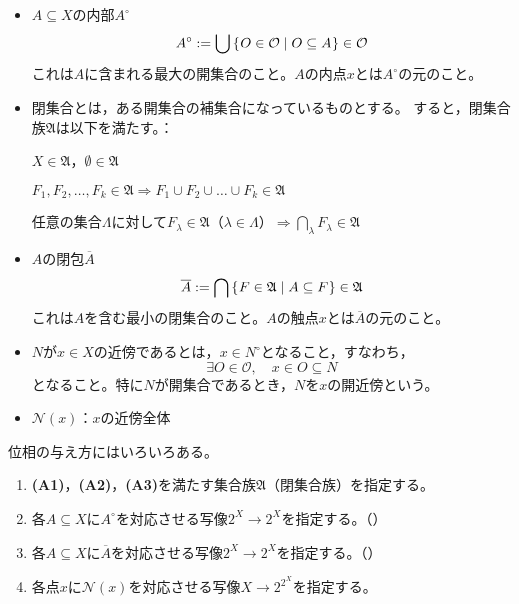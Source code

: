\documentclass[uplatex]{jsarticle}
\begin{document}
\begin{itemize}
  \vspace{-0.5\baselineskip}
  \item $A \subseteq X$の内部$A^{\circ}$
  \begin{equation}
    A^{\circ} := \bigcup \Set{\hspace{-1.8pt} O \in \mathcal{O} | O \subseteq A \hspace{-1.8pt}} \in \mathcal{O}
  \end{equation}
  これは$A$に含まれる最大の開集合のこと。$A$の内点$x$とは$A^{\circ}$の元のこと。
  \item 閉集合とは，ある開集合の補集合になっているものとする。
  すると，閉集合族$\mathfrak{A}$は以下を満たす。：

   $X \in \mathfrak{A}$，$\emptyset \in \mathfrak{A}$

   $F_{1}, F_{2}, \dots, F_{k} \in \mathfrak{A} \Longrightarrow F_{1} \cup F_{2} \cup \dots \cup F_{k} \in \mathfrak{A}$

   任意の集合$\Lambda$に対して$F_{\lambda} \in \mathfrak{A} $（$\lambda \in \Lambda$）$\Longrightarrow {\displaystyle \bigcap_{\lambda} F_{\lambda} \in \mathfrak{A}}$

  \item $A$の閉包$\overline{A}$
  \begin{equation}
    \overline{A} := \bigcap \Set{\hspace{-1.8pt} F \in \mathfrak{A} | A \subseteq F \hspace{-1.8pt}} \in \mathfrak{A}
  \end{equation}
  これは$A$を含む最小の閉集合のこと。$A$の触点$x$とは$\overline{A}$の元のこと。
  \item $N$が$x \in X$の近傍であるとは，$x \in N^{\circ}$となること，すなわち，
  \begin{equation}
    \exists O \in \mathcal{O}, \quad x \in O \subseteq N
  \end{equation}
  となること。特に$N$が開集合であるとき，$N$を$x$の開近傍という。
  \item $\mathcal{N}(x)$：$x$の近傍全体
\end{itemize}

位相の与え方にはいろいろある。
\begin{enumerate}
  \item {\bf (A1)}，{\bf (A2)}，{\bf (A3)}を満たす集合族$\mathfrak{A}$（閉集合族）を指定する。
  \item 各$A \subseteq X$に$A^{\circ}$を対応させる写像$2^{X} \longrightarrow 2^{X}$を指定する。（）
  \item 各$A \subseteq X$に$\overline{A}$を対応させる写像$2^{X} \longrightarrow 2^{X}$を指定する。（）
  \item 各点$x$に$\mathcal{N}(x)$を対応させる写像$X \longrightarrow 2^{2^{X}}$を指定する。
\end{enumerate}
\end{document}
